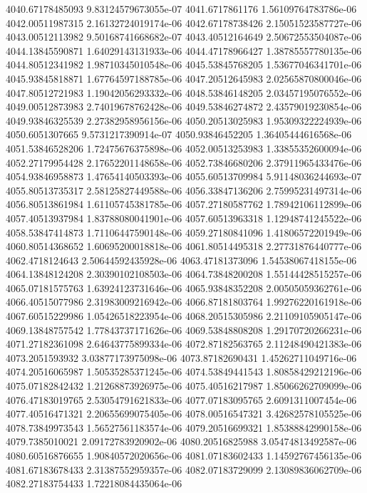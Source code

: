 {4040.67178485093 9.83124579673055e-07
4041.6717861176 1.56109764783786e-06
4042.00511987315 2.16132724019174e-06
4042.67178738426 2.15051523587727e-06
4043.00512113982 9.50168741668682e-07
4043.40512164649 2.50672553504087e-06
4044.13845590871 1.64029143131933e-06
4044.47178966427 1.38785557780135e-06
4044.80512341982 1.98710345010548e-06
4045.53845768205 1.53677046341701e-06
4045.93845818871 1.67764597188785e-06
4047.20512645983 2.02565870800046e-06
4047.80512721983 1.19042056293332e-06
4048.53846148205 2.03457195076552e-06
4049.00512873983 2.74019678762428e-06
4049.53846274872 2.43579019230854e-06
4049.93846325539 2.27382958956156e-06
4050.20513025983 1.95309322224939e-06
4050.6051307665 9.5731217390914e-07
4050.93846452205 1.36405444616568e-06
4051.53846528206 1.72475676375898e-06
4052.00513253983 1.33855352600094e-06
4052.27179954428 2.17652201148658e-06
4052.73846680206 2.37911965433476e-06
4054.93846958873 1.47654140503393e-06
4055.60513709984 5.91148036244693e-07
4055.80513735317 2.58125827449588e-06
4056.33847136206 2.75995231497314e-06
4056.80513861984 1.61105745381785e-06
4057.27180587762 1.78942106112899e-06
4057.40513937984 1.83788080041901e-06
4057.60513963318 1.12948741245522e-06
4058.53847414873 1.71106447590148e-06
4059.27180841096 1.41806572201949e-06
4060.80514368652 1.60695200018818e-06
4061.80514495318 2.27731876440777e-06
4062.4718124643 2.50644592435928e-06
4063.47181373096 1.54538067418155e-06
4064.13848124208 2.30390102108503e-06
4064.73848200208 1.55144428515257e-06
4065.07181575763 1.63924123731646e-06
4065.93848352208 2.00505059362761e-06
4066.40515077986 2.31983009216942e-06
4066.87181803764 1.99276220161918e-06
4067.60515229986 1.05426518223954e-06
4068.20515305986 2.21109105905147e-06
4069.13848757542 1.77843737171626e-06
4069.53848808208 1.29170720266231e-06
4071.27182361098 2.64643775899334e-06
4072.87182563765 2.11248490421383e-06
4073.2051593932 3.03877173975098e-06
4073.87182690431 1.45262711049716e-06
4074.20516065987 1.50535285371245e-06
4074.53849441543 1.80858429212196e-06
4075.07182842432 1.21268873926975e-06
4075.40516217987 1.85066262709099e-06
4076.47183019765 2.53054791621833e-06
4077.07183095765 2.6091311007454e-06
4077.40516471321 2.20655699075405e-06
4078.00516547321 3.42682578105525e-06
4078.73849973543 1.56527561183574e-06
4079.20516699321 1.85388842990158e-06
4079.7385010021 2.09172783920902e-06
4080.20516825988 3.05474813492587e-06
4080.60516876655 1.90840572020656e-06
4081.07183602433 1.14592767456135e-06
4081.67183678433 2.31387552959357e-06
4082.07183729099 2.13089836062709e-06
4082.27183754433 1.72218084435064e-06
}
